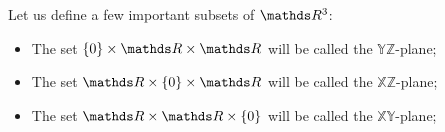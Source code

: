 \begin{df}
	Let us define a few important subsets of $\R^3$:
	\begin{itemize}
		\item The set $\{0\}\times \R\times \R$ will be called the $\mathds{YZ}$-plane;
		\item The set $\R\times\{0\}\times \R$ will be called the $\mathds{XZ}$-plane;
		\item The set $\R\times \R\times \{0\}$ will be called the $\mathds{XY}$-plane;		
	\end{itemize}
\end{df}